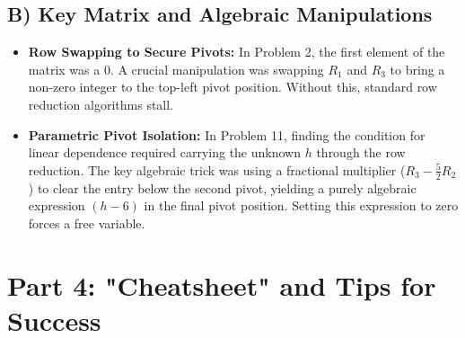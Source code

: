 \documentclass[11pt]{article}
\begin{document}
\subsection{B) Key Matrix and Algebraic Manipulations}
\begin{itemize}
    \item \textbf{Row Swapping to Secure Pivots:} In Problem 2, the first element of the matrix was a $0$. A crucial manipulation was swapping $R_1$ and $R_3$ to bring a non-zero integer to the top-left pivot position. Without this, standard row reduction algorithms stall.
    \item \textbf{Parametric Pivot Isolation:} In Problem 11, finding the condition for linear dependence required carrying the unknown $h$ through the row reduction. The key algebraic trick was using a fractional multiplier ($R_3 - \frac{5}{2}R_2$) to clear the entry below the second pivot, yielding a purely algebraic expression $(h - 6)$ in the final pivot position. Setting this expression to zero forces a free variable.
\end{itemize}

\newpage

\section{Part 4: "Cheatsheet" and Tips for Success}
\end{document}
